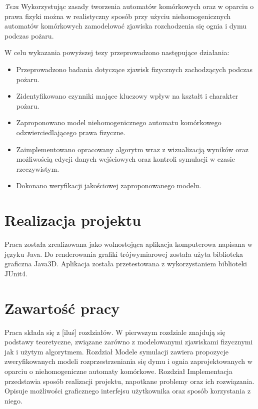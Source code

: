 


\textit{Teza} Wykorzystując zasady tworzenia automatów komórkowych oraz w oparciu o prawa fizyki można w realistyczny sposób
przy użyciu niehomogenicznych 
automatów komórkowych
zamodelować zjawiska rozchodzenia się ognia i dymu podczas pożaru.

W celu wykazania powyższej tezy przeprowadzono następujące działania:
\begin{itemize}
\item Przeprowadzono badania dotyczące zjawisk fizycznych zachodzących podczas pożaru.
\item Zidentyfikowano czynniki mające kluczowy wpływ na kształt i charakter pożaru.
\item Zaproponowano model niehomogenicznego automatu komórkowego odzwierciedlającego prawa fizyczne.
\item Zaimplementowano opracowany algorytm wraz z wizualizacją wyników oraz możliwością edycji danych wejściowych oraz kontroli symulacji w czasie rzeczywistym.
\item Dokonano weryfikacji jakościowej zaproponowanego modelu.
\end{itemize}

\section {Realizacja projektu} %
Praca została zrealizowana jako wolnostojąca aplikacja komputerowa napisana w języku Java. Do renderowania grafiki trójwymiarowej
została użyta biblioteka graficzna Java3D. Aplikacja została przetestowana z wykorzystaniem biblioteki JUnit4. 

\section{Zawartość pracy} %
Praca składa się z [iluś] rozdziałów. 
W pierwszym rozdziale znajdują się podstawy teoretyczne, związane zarówno z modelowanymi zjawiskami fizycznymi jak i użytym algorytmem.
Rozdział Modele symulacji zawiera propozycje zweryfikowanych modeli rozprzestrzeniania się dymu i ognia zaprojektowanych w oparciu
o niehomogeniczne automaty komórkowe. Rozdział Implementacja przedstawia sposób realizacji projektu, napotkane problemy oraz 
ich rozwiązania. Opisuje możliwości graficznego interfejsu użytkownika oraz sposób korzystania z niego.
